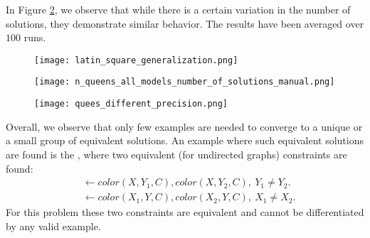 In Figure \ref{fig:systematic_solutions}, we observe that while there is a certain variation in the number of solutions, they demonstrate similar behavior.   The results have been averaged over $100$ runs.


\begin{figure*}[tb]
  \centering
 \begin{subfigure}[t]{0.325\textwidth}
  \texttt{[image: latin\_square\_generalization.png]}
  \caption{}
  \label{fig:latin_square_generalization}
\end{subfigure}
\hfill
\begin{subfigure}[t]{0.325\textwidth}
  \texttt{[image: n\_queens\_all\_models\_number\_of\_solutions\_manual.png]}
  \caption{}
  \label{fig:systematic_solutions}
  \end{subfigure}
\hfill
 \begin{subfigure}[t]{0.325\textwidth}
  \texttt{[image: quees\_different\_precision.png]}
  \caption{}
  \label{fig:systematic_precision}
\end{subfigure}
\caption{}
\end{figure*}




Overall, we observe that only few examples are needed to converge to a unique or a small group of equivalent solutions. An example where such equivalent solutions are found is the , where two equivalent (for undirected graphs) constraints are found:
\begin{equation*}
  \begin{aligned}
 &\leftarrow \textit{color}(X,Y_1,C), \textit{color}(X,Y_2,C),~Y_1 \neq Y_2.\\
 &\leftarrow \textit{color}(X_1,Y,C), \textit{color}(X_2,Y,C),~X_1 \neq X_2.
  \end{aligned}
\end{equation*}
For this problem these two constraints are equivalent and cannot be differentiated by any valid example. %



